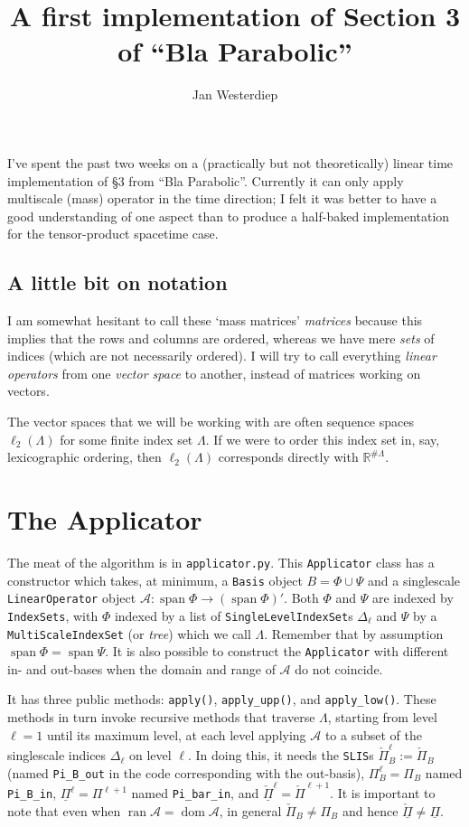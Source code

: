 \documentclass[11pt,a4paper]{amsart}
\theoremstyle{definition}
\DeclareMathOperator{\ran}{ran}
\DeclareMathOperator{\dom}{dom}
\DeclareMathOperator{\spann}{span}
\renewcommand{\span}{\spann}
\begin{document}
\title{A first implementation of Section 3 of ``Bla Parabolic''}
\author{Jan Westerdiep}
\maketitle

I've spent the past two weeks on a (practically but not theoretically) linear time implementation of \S 3
from ``Bla Parabolic''. Currently it can only apply multiscale (mass) operator
in the time direction; I felt it was better to have a good understanding of one
aspect than to produce a half-baked implementation for the tensor-product spacetime case.

\subsection*{A little bit on notation} I am somewhat hesitant to call these
`mass matrices' \emph{matrices} because this implies that the rows and columns
are ordered, whereas we have mere \emph{sets} of indices (which are not necessarily
ordered). I will try to call everything \emph{linear operators} from one
\emph{vector space} to another, instead of matrices working on vectors.

The vector spaces that we will be working with are often sequence spaces
$\ell_2(\Lambda)$ for some finite index set $\Lambda$. If we were to order this
index set in, say, lexicographic ordering, then $\ell_2(\Lambda)$ corresponds
directly with $\mathbb{R}^{\# \Lambda}$.

\section{The Applicator}
The meat of the algorithm is in \texttt{applicator.py}. This \texttt{Applicator}
class has a constructor which takes, at minimum, a \texttt{Basis} object
$B = \Phi \cup \Psi$ and a singlescale \texttt{LinearOperator} object
$\mathcal A: \span \Phi \to (\span \Phi)'$. Both $\Phi$ and $\Psi$ are indexed by
\texttt{IndexSets}, with $\Phi$ indexed by a list of \texttt{SingleLevelIndexSet}s
$\Delta_\ell$ and $\Psi$ by a \texttt{MultiScaleIndexSet} (or \emph{tree})
which we call $\Lambda$. Remember that by assumption $\span \Phi = \span \Psi$.
It is also possible to construct the \texttt{Applicator} with different in- and
out-bases when the domain and range of $\mathcal A$ do not coincide.

It has three public methods: \texttt{apply()}, \texttt{apply\_upp()},
and \texttt{apply\_low()}. These methods in turn invoke recursive methods that
traverse $\Lambda$, starting from level $\ell=1$ until its maximum level, at
each level applying $\mathcal A$ to a subset of the singlescale indices
$\Delta_\ell$ on level $\ell$. In doing this, it needs the \texttt{SLIS}s
$\check \Pi_B^\ell := \check \Pi_B$ (named \texttt{Pi\_B\_out} in the code
corresponding with the out-basis), $\Pi_B^\ell = \Pi_B$ named
\texttt{Pi\_B\_in}, $\underline \Pi^\ell = \Pi^{\ell + 1}$ named \texttt{Pi\_bar\_in},
and $\underline{\check \Pi}^\ell = \check \Pi^{\ell+1}$. It is important to note 
that even when $\ran \mathcal A = \dom \mathcal A$, in general $\check \Pi_B \not= \Pi_B$
and hence $\underline{\check \Pi} \not= \underline \Pi$.
\end{document}
